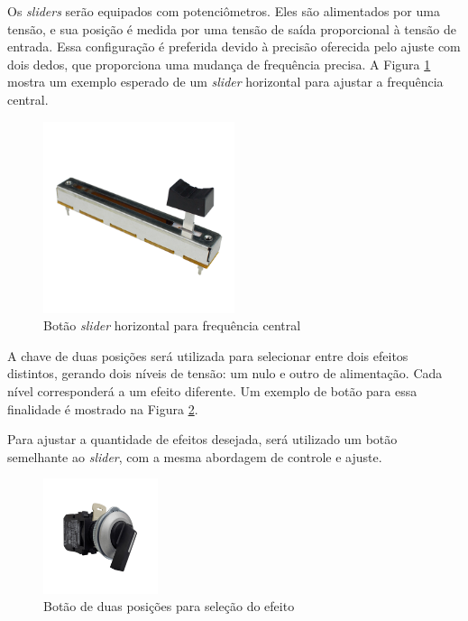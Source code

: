 Os \textit{sliders} serão equipados com potenciômetros. Eles são alimentados por uma tensão, e sua posição é medida por uma tensão de saída proporcional à tensão de entrada. Essa configuração é preferida devido à precisão oferecida pelo ajuste com dois dedos, que proporciona uma mudança de frequência precisa. A Figura \ref{fig61} mostra um exemplo esperado de um \textit{slider} horizontal para ajustar a frequência central.

\begin{figure}[h]
    \centering
    \includegraphics[width=0.5\textwidth]{figuras/fig61.png}
    \caption{Botão \textit{slider} horizontal para frequência central \cite{robocore}}
    \label{fig61}
\end{figure}

A chave de duas posições será utilizada para selecionar entre dois efeitos distintos, gerando dois níveis de tensão: um nulo e outro de alimentação. Cada nível corresponderá a um efeito diferente. Um exemplo de botão para essa finalidade é mostrado na Figura \ref{fig62}.

Para ajustar a quantidade de efeitos desejada, será utilizado um botão semelhante ao \textit{slider}, com a mesma abordagem de controle e ajuste.

\begin{figure}[h]
    \centering
    \includegraphics[width=0.3\textwidth]{figuras/fig62.png}
    \caption{Botão de duas posições para seleção do efeito \cite{evea}}
    \label{fig62}
\end{figure}


